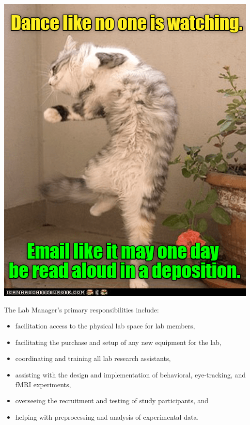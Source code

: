 \documentclass[]{book}
\providecommand{\tightlist}{%
  \setlength{\itemsep}{0pt}\setlength{\parskip}{0pt}}
\begin{document}
\includegraphics{images/email.png}

The Lab Manager's primary responsibilities include:

\begin{itemize}
\tightlist
\item
  facilitation access to the physical lab space for lab members,
\item
  facilitating the purchase and setup of any new equipment for the lab,\\
\item
  coordinating and training all lab research assistants,\\
\item
  assisting with the design and implementation of behavioral, eye-tracking, and fMRI experiments,\\
\item
  overseeing the recruitment and testing of study participants, and\\
\item
  helping with preprocessing and analysis of experimental data.
\end{itemize}
\end{document}
